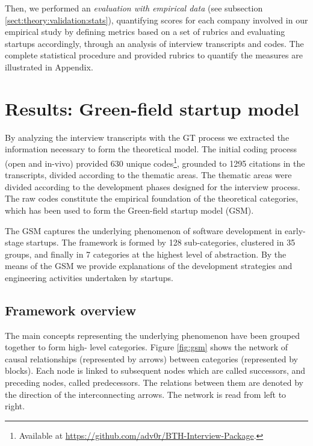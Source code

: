 \documentclass[10pt,journal,letterpaper,compsoc]{IEEEtran}
\begin{document}
Then, we performed an \textit{evaluation with empirical data} (see subsection
\ref{sect:theory:validation:stats}), quantifying scores for each company
involved in our empirical study by defining metrics based on a set of rubrics
and evaluating startups accordingly, through an analysis of interview
transcripts and codes. The complete statistical procedure and provided  rubrics
to quantify the measures are illustrated in Appendix.




\section{Results: Green-field startup model}\label{res:gsm}

By analyzing the interview transcripts with the GT process we extracted the
information necessary to form the theoretical model. The initial coding process
(open and in-vivo) provided 630 unique codes\footnote{Available at
\url{https://github.com/adv0r/BTH-Interview-Package}.}, grounded to 1295
citations in the transcripts, divided according to the thematic areas. The
thematic areas were divided according to the development phases designed for the
interview process. The raw codes constitute the empirical foundation of the
theoretical categories, which has been used to form the Green-field startup
model (GSM).

The GSM captures the underlying phenomenon of software development in  early-
stage startups. The framework is formed by 128 sub-categories, clustered  in 35
groups, and finally in 7 categories at the highest level of abstraction.  By the
means of the GSM we provide explanations of the development strategies  and
engineering activities undertaken by startups.
\subsection{Framework overview} \label{res:gsm:frmov} The main concepts
representing the underlying phenomenon have been grouped  together to form high-
level categories. Figure \ref{fig:gsm} shows the network  of causal
relationships (represented by arrows) between categories (represented  by
blocks). Each node is linked to subsequent nodes which are called successors,
and preceding nodes, called predecessors. The relations between them are denoted
by the direction of the interconnecting arrows. The network is read from left to
right.
\end{document}
